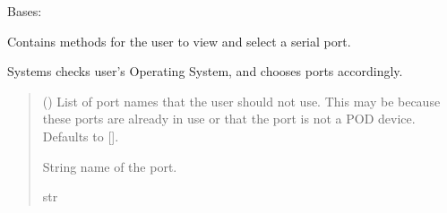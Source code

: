 \documentclass[letterpaper,10pt,english]{sphinxmanual}
\begin{document}
\begin{fulllineitems}
\label{\detokenize{Morelia.Devices.SerialPorts:Morelia.Devices.SerialPorts.PortAccess.FindPorts}}
\pysigstartsignatures
{}
\pysigstopsignatures
\sphinxAtStartPar
Bases: 

\sphinxAtStartPar
Contains methods for the user to view and select a serial port.

\begin{fulllineitems}
\label{\detokenize{Morelia.Devices.SerialPorts:Morelia.Devices.SerialPorts.PortAccess.FindPorts.ChoosePort}}
\pysigstartsignatures
{}
\pysigstopsignatures
\sphinxAtStartPar
Systems checks user’s Operating System, and chooses ports accordingly.
\begin{quote}\begin{description}
\sphinxAtStartPar
{} (\sphinxstyleliteralemphasis{\sphinxupquote{{[}}}\sphinxstyleliteralemphasis{\sphinxupquote{{]}}}\sphinxstyleliteralemphasis{\sphinxupquote{, }}) \textendash{} List of port names that the user should                 not use. This may be because these ports are already in use or that                 the port is not a POD device. Defaults to {[}{]}.

\sphinxAtStartPar
String name of the port.

\sphinxAtStartPar
str

\end{description}\end{quote}

\end{fulllineitems}


\end{fulllineitems}
\end{document}
